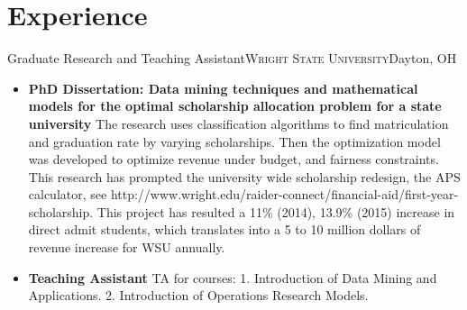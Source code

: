 \documentclass[12pt,letterpaper,roman]{moderncv} %
\begin{document}
\section{Experience}
 {Graduate Research and Teaching
Assistant}{\textsc{Wright State University}}{Dayton, OH}{}{
\begin{itemize}
\item \textbf{PhD Dissertation: Data mining techniques and mathematical models for the optimal scholarship allocation problem for a state university}
\newline
The research uses classification algorithms to find
matriculation and graduation rate by varying scholarships. Then the
optimization model was developed to optimize revenue under budget, and fairness constraints.
This research has prompted the university wide scholarship redesign, the APS
calculator, see http://www.wright.edu/raider-connect/financial-aid/first-year-scholarship.
This project has resulted a 11\% (2014), 13.9\% (2015) increase in direct admit
students, which translates into a 5 to 10 million dollars of revenue increase
for WSU annually.
\item \textbf{Teaching Assistant}
TA for courses:
1. Introduction of Data Mining and Applications. 
2. Introduction of
Operations Research Models.
\end{itemize} }


\bigskip
\end{document}
